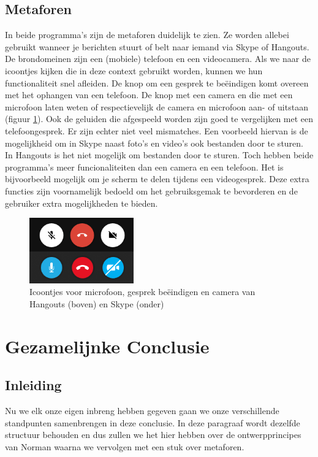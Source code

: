 \documentclass[11pt]{article}
\begin{document}
\subsection{Metaforen}
In beide programma's zijn de metaforen duidelijk te zien. Ze worden allebei gebruikt wanneer je berichten stuurt of belt naar iemand via Skype of Hangouts. De brondomeinen zijn een (mobiele) telefoon en een videocamera. Als we naar de icoontjes kijken die in deze context gebruikt worden, kunnen we hun functionaliteit snel afleiden. De knop om een gesprek te be\"eindigen  komt overeen met het ophangen van een telefoon. De knop met een camera en die met een microfoon laten weten of respectievelijk de camera en microfoon aan- of uitstaan (figuur \ref{fig:SHMetafoor}). Ook de geluiden die afgespeeld worden zijn goed te vergelijken met een telefoongesprek. Er zijn echter niet veel mismatches. Een voorbeeld hiervan is de mogelijkheid om in Skype naast foto's en video's ook bestanden door te sturen. In Hangouts is het niet mogelijk om bestanden door te sturen. Toch hebben beide programma's meer funcionaliteiten dan een camera en een telefoon. Het is bijvoorbeeld mogelijk om je scherm te delen tijdens een videogesprek. Deze extra functies zijn voornamelijk bedoeld om het gebruiksgemak te bevorderen en de gebruiker extra mogelijkheden te bieden.
\begin{figure}
	\centering
	\includegraphics[width=0.4\textwidth]{Dylan_SHMetafoor.png}
	\caption{Icoontjes voor microfoon, gesprek be\"eindigen en camera van Hangouts (boven) en Skype (onder)}
	\label{fig:SHMetafoor}
\end{figure}
\newpage


\section{Gezamelijnke Conclusie}
\subsection{Inleiding}
Nu we elk onze eigen inbreng hebben gegeven gaan we onze verschillende standpunten samenbrengen in deze conclusie. In deze paragraaf wordt dezelfde structuur behouden en dus zullen we het hier hebben over de ontwerpprincipes van Norman waarna we vervolgen met een stuk over metaforen.
\end{document}
